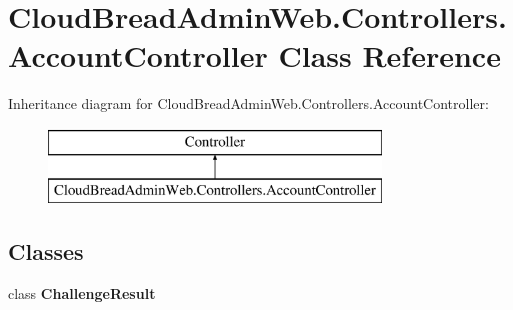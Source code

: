 \hypertarget{a00007}{}\section{Cloud\+Bread\+Admin\+Web.\+Controllers.\+Account\+Controller Class Reference}
\label{a00007}
Inheritance diagram for Cloud\+Bread\+Admin\+Web.\+Controllers.\+Account\+Controller\+:\begin{figure}[H]
\begin{center}
\leavevmode
\includegraphics[height=2.000000cm]{a00007}
\end{center}
\end{figure}
\subsection*{Classes}
\begin{DoxyCompactItemize}
\item 
class {\bfseries Challenge\+Result}
\end{DoxyCompactItemize}
